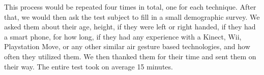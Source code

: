 This process would be repeated four times in total, one for each technique. 
After that, we would then ask the test subject to fill in a small demographic survey. 
We asked them about their age, height, if they were left or right handed, if they had a smart phone, for how long, if they had any experience with a Kinect, Wii, Playstation Move, or any other similar air gesture based technologies, and how often they utilized them. 
We then thanked them for their time and sent them on their way. 
The entire test took on average 15 minutes. 